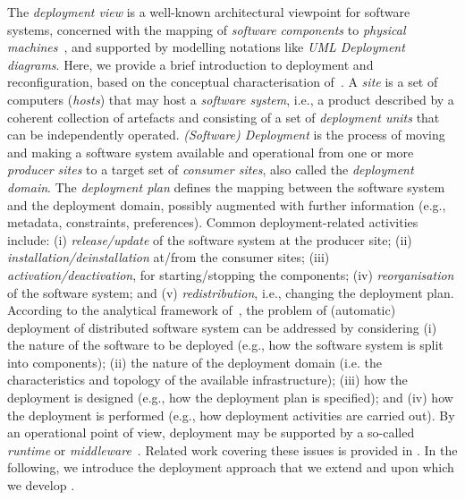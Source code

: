 \documentclass[conference]{IEEEtran}
\begin{document}
The \emph{deployment view} is a well-known architectural viewpoint for software systems,
concerned with the mapping of \emph{software components} to \emph{physical machines}~\cite{DBLP:journals/software/Kruchten95}, 
 and supported by modelling notations like \emph{UML Deployment diagrams}.
%
Here, we provide a brief introduction to deployment and reconfiguration, based on the conceptual characterisation of~\cite{DBLP:journals/jss/ArcangeliBL15,carzaniga1998characterization}.
%
A \emph{site} is a set of computers (\emph{hosts}) that may host a \emph{software system}, i.e., a product described by a coherent collection of artefacts and consisting of a set of \emph{deployment units} that can be independently operated.
%
\emph{(Software) Deployment} is the process of moving and making a software system available and operational from one or more \emph{producer sites} to a target set of \emph{consumer sites}, also called the \emph{deployment domain}.
%
The \emph{deployment plan} defines 
 the mapping between the software system
 and the deployment domain,
 possibly augmented with further information (e.g., metadata, constraints, preferences).
%
Common deployment-related activities 
 include: (i) \emph{release/update} of the software system at the producer site;
 (ii) \emph{installation/deinstallation} at/from the consumer sites;
 (iii) \emph{activation/deactivation}, for starting/stopping the components;
 (iv) \emph{reorganisation} of the software system;
 and (v) \emph{redistribution}, i.e., changing the deployment plan.
%
According to the analytical framework of~\cite{DBLP:journals/jss/ArcangeliBL15},
  the problem of (automatic) deployment of distributed software system can be addressed by considering
 (i) the nature of the software to be deployed (e.g., how the software system is split into components);
 (ii) the nature of the deployment domain (i.e. the characteristics and topology of the available infrastructure);
 (iii) how the deployment is designed (e.g., how the deployment plan is specified);
 and 
 (iv) how the deployment is performed (e.g., how deployment activities are carried out).
%
By an operational point of view, 
 deployment may be supported by a so-called \emph{runtime} or \emph{middleware}~\cite{DBLP:journals/cacm/GazisK22}.
%
Related work covering these issues is provided in .
%
In the following, we introduce the deployment approach 
  that we extend and upon which we develop \ourframework{}.
\end{document}

